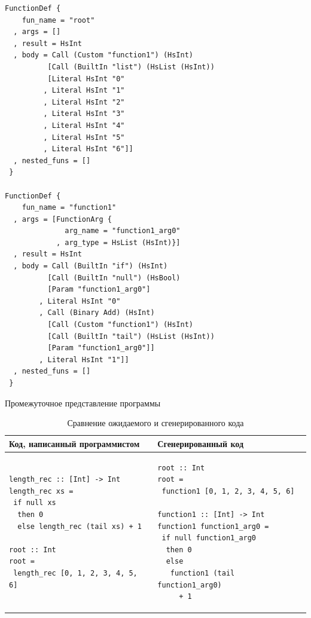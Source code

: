 \begin{ListingEnv}[h]
\begin{lstlisting}
FunctionDef {
    fun_name = "root"
  , args = []
  , result = HsInt
  , body = Call (Custom "function1") (HsInt) 
          [Call (BuiltIn "list") (HsList (HsInt)) 
          [Literal HsInt "0"
         , Literal HsInt "1"
         , Literal HsInt "2"
         , Literal HsInt "3"
         , Literal HsInt "4"
         , Literal HsInt "5"
         , Literal HsInt "6"]]
  , nested_funs = []
 }
 
FunctionDef {
    fun_name = "function1"
  , args = [FunctionArg {
              arg_name = "function1_arg0"
            , arg_type = HsList (HsInt)}]
  , result = HsInt
  , body = Call (BuiltIn "if") (HsInt) 
          [Call (BuiltIn "null") (HsBool) 
          [Param "function1_arg0"]
        , Literal HsInt "0"
        , Call (Binary Add) (HsInt) 
          [Call (Custom "function1") (HsInt) 
          [Call (BuiltIn "tail") (HsList (HsInt)) 
          [Param "function1_arg0"]]
        , Literal HsInt "1"]]
  , nested_funs = []
 }
\end{lstlisting}
\caption{Промежуточное представление программы}\label{intermed}
\end{ListingEnv}

\begin{table}[h]
\centering
\begin{tabular}{|l|l|}
\hline
Код, написанный программистом &
Сгенерированный код \\
\hline
\begin{lstlisting}
length_rec :: [Int] -> Int
length_rec xs = 
 if null xs
  then 0
  else length_rec (tail xs) + 1

root :: Int
root = 
 length_rec [0, 1, 2, 3, 4, 5, 6]
\end{lstlisting} &
\begin{lstlisting}
root :: Int
root = 
 function1 [0, 1, 2, 3, 4, 5, 6]

function1 :: [Int] -> Int
function1 function1_arg0 = 
 if null function1_arg0
  then 0
  else 
   function1 (tail function1_arg0)
     + 1
\end{lstlisting} \\
\hline
\end{tabular}
\caption{Сравнение ожидаемого и сгенерированного кода}\label{expectreal}
\end{table}

